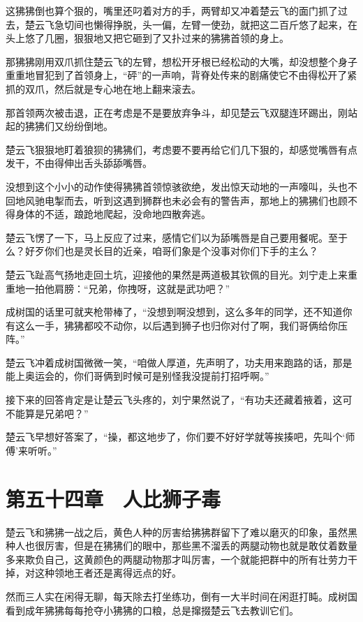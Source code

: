 这狒狒倒也算个狠的，嘴里还叼着对方的手，两臂却又冲着楚云飞的面门抓了过去，楚云飞急切间也懒得挣脱，头一偏，左臂一使劲，就把这二百斤悠了起来，在头上悠了几圈，狠狠地又把它砸到了又扑过来的狒狒首领的身上。

那狒狒刚用双爪抓住楚云飞的左臂，想松开牙根已经松动的大嘴，却没想整个身子重重地冒犯到了首领身上，“砰”的一声响，背脊处传来的剧痛使它不由得松开了紧抓的双爪，然后就是专心地在地上翻来滚去。

那首领两次被击退，正在考虑是不是要放弃争斗，却见楚云飞双腿连环踢出，刚站起的狒狒们又纷纷倒地。

楚云飞狠狠地盯着狼狈的狒狒们，考虑要不要再给它们几下狠的，却感觉嘴唇有点发干，不由得伸出舌头舔舔嘴唇。

没想到这个小小的动作使得狒狒首领惊骇欲绝，发出惊天动地的一声嚎叫，头也不回地风驰电掣而去，听到这遇到狮群也未必会有的警告声，那地上的狒狒们也顾不得身体的不适，踉跄地爬起，没命地四散奔逃。

楚云飞愣了一下，马上反应了过来，感情它们以为舔嘴唇是自己要用餐呢。至于么？好歹你们也是灵长目的近亲，咱哥们象是个没事对你们下手的主么？

楚云飞趾高气扬地走回土坑，迎接他的果然是两道极其钦佩的目光。刘宁走上来重重地一拍他肩膀：“兄弟，你拽呀，这就是武功吧？”

成树国的话里可就夹枪带棒了，“没想到啊没想到，这么多年的同学，还不知道你有这么一手，狒狒都咬不动你，以后遇到狮子也归你对付了啊，我们哥俩给你压阵。”

楚云飞冲着成树国微微一笑，“咱做人厚道，先声明了，功夫用来跑路的话，那是能上奥运会的，你们哥俩到时候可是别怪我没提前打招呼啊。”

接下来的回答肯定是让楚云飞头疼的，刘宁果然说了，“有功夫还藏着掖着，这可不能算是兄弟吧？”

楚云飞早想好答案了，“操，都这地步了，你们要不好好学就等挨揍吧，先叫个‘师傅’来听听。”

\section{第五十四章　人比狮子毒}

楚云飞和狒狒一战之后，黄色人种的厉害给狒狒群留下了难以磨灭的印象，虽然黑种人也很厉害，但是在狒狒们的眼中，那些黑不溜丢的两腿动物也就是敢仗着数量多来欺负自己，这黄颜色的两腿动物那才叫厉害，一个就能把群中的所有壮劳力干掉，对这种领地王者还是离得远点的好。

然而三人实在闲得无聊，每天除去打坐练功，倒有一大半时间在闲逛打盹。成树国看到成年狒狒每每抢夺小狒狒的口粮，总是撺掇楚云飞去教训它们。

